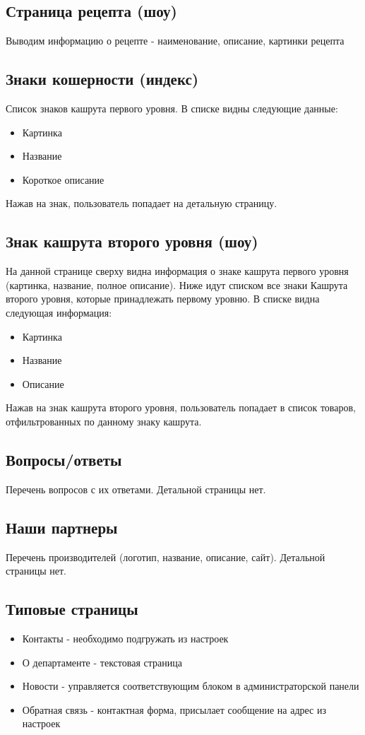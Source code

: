 \documentclass[DIV=calc, paper=a4, fontsize=11pt]{scrartcl} %
\begin{document}
\subsection{Страница рецепта (шоу)}
Выводим информацию о рецепте - наименование, описание, картинки рецепта

\subsection{Знаки кошерности (индекс)}
Список знаков кашрута первого уровня. В списке видны следующие данные:
\begin{itemize}
	\item Картинка
	\item Название
	\item Короткое описание
\end{itemize}
Нажав на знак, пользователь попадает на детальную страницу.

\subsection{Знак кашрута второго уровня (шоу)}
На данной странице сверху видна информация о знаке кашрута первого уровня (картинка, название, полное описание). Ниже идут списком все знаки Кашрута второго уровня, которые принадлежать первому уровню. В списке видна следующая информация:
\begin{itemize}
	\item Картинка
	\item Название
	\item Описание
\end{itemize}

Нажав на знак кашрута второго уровня, пользователь попадает в список товаров, отфильтрованных по данному знаку кашрута.

\subsection{Вопросы/ответы}
Перечень вопросов с их ответами. Детальной страницы нет.

\subsection{Наши партнеры}
Перечень производителей (логотип, название, описание, сайт). Детальной страницы нет.

\subsection{Типовые страницы}

\begin{itemize}
	\item Контакты - необходимо подгружать из настроек 
	\item О департаменте - текстовая страница
	\item Новости - управляется соответствующим блоком в администраторской панели
	\item Обратная связь - контактная форма, присылает сообщение на адрес из настроек
\end{itemize}
\end{document}
